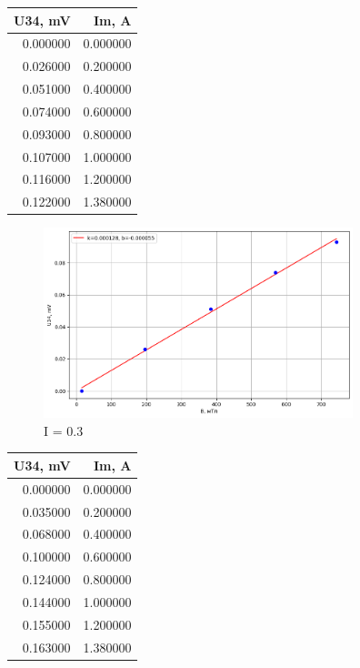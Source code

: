 \documentclass[a4paper, 12pt]{article}
\begin{document}
\begin{table}[h!]
    \centering
\begin{tabular}{rr}
    \toprule
    U34, mV & Im, A \\
    \midrule
    0.000000 & 0.000000 \\
    0.026000 & 0.200000 \\
    0.051000 & 0.400000 \\
    0.074000 & 0.600000 \\
    0.093000 & 0.800000 \\
    0.107000 & 1.000000 \\
    0.116000 & 1.200000 \\
    0.122000 & 1.380000 \\
    \bottomrule
    \end{tabular}
\end{table}
\newpage
    \begin{figure}[h!]
        \centering
        \includegraphics[width=90mm]{./images/image.png}
        \caption{I = 0.3}
    \end{figure}
    \begin{table}[h!]
        \centering
    \begin{tabular}{rr}
        \toprule
        U34, mV & Im, A \\
        \midrule
        0.000000 & 0.000000 \\
        0.035000 & 0.200000 \\
        0.068000 & 0.400000 \\
        0.100000 & 0.600000 \\
        0.124000 & 0.800000 \\
        0.144000 & 1.000000 \\
        0.155000 & 1.200000 \\
        0.163000 & 1.380000 \\
        \bottomrule
        \end{tabular}
    \end{table}
\end{document}

